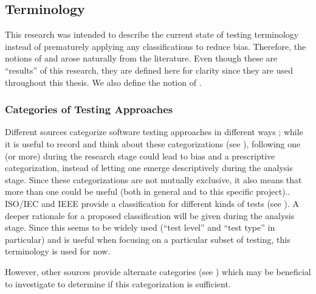 \ifnotpaper\else\ieeeTestTermsTable{}\fi

\subsection{Terminology}

This research was intended to describe the current state of testing
terminology instead of prematurely applying any classifications to reduce bias.
Therefore, the notions of  and 
arose naturally from the literature. Even though these are ``results'' of this
research, they are defined here for clarity since they are used throughout this
thesis. We also define the notion of .

\subsubsection{Categories of Testing Approaches}
\label{categories-observ}

Different sources categorize software testing approaches in different ways%
\ifnotpaper
    ; while it is useful to record and think about these
    categorizations (see ), following one (or more)
    during the research
    stage could lead to bias and a prescriptive categorization, instead of letting
    one emerge descriptively during the analysis stage. Since these categorizations
    are not mutually exclusive, it also means that more than one could be useful
    (both in general and to this specific project).\newline \else.\fi\
\ifnotpaper \citet{IEEE2022} \else ISO/IEC and IEEE \cite{IEEE2022} \fi provide
a classification for different kinds of tests (see \refIEEETestTerms{}).
\ifnotpaper A deeper rationale for a proposed classification will be given
    during the analysis stage. \else Since
    this seems to be widely used (``test level'' and ``test type'' in particular)
    and is useful when focusing on a particular subset of testing, this terminology
    is used for now. \fi

\ifnotpaper
However, other sources \citep{BarbosaEtAl2006, SouzaEtAl2017} provide alternate
categories (see \refOtherTestTerms{}) which may be beneficial to investigate to
determine if this categorization is sufficient.

